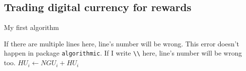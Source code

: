 \documentclass[12pt,tightenlines,letterpaper]{scrartcl}
\begin{document}

 	
 \subsection{Trading digital currency for rewards}
 \begin{algorithm}[ht]
   \caption{My first algorithm}\label{alg:algorithm1}
   \begin{algorithmic}[1]
     \Require
       \Statex If there are multiple lines here, line's number will be wrong.
       \Statex This error doesn't happen in package \verb|algorithmic|.
     \Ensure
       \Statex If I write \verb|\\| here, line's number will be wrong too.
     \Statex
      
       \State ${\textit{HU}}_{i} \gets {\textit{NGU}}_{i} + {HU}_{i}$ 
     \EndIf
   \end{algorithmic}
 \end{algorithm}
 
 
 
\end{document}
